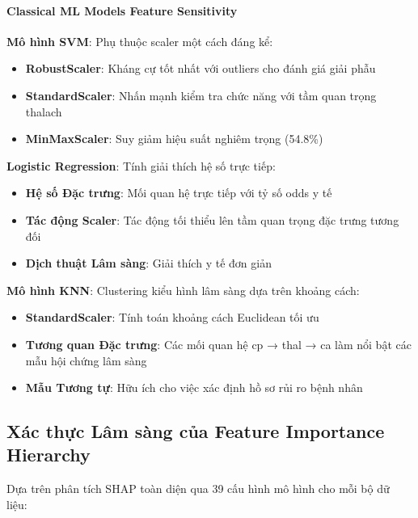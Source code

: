 \paragraph{Classical ML Models Feature Sensitivity}

\textbf{Mô hình SVM}: Phụ thuộc scaler một cách đáng kể:
\begin{itemize}
    \item \textbf{RobustScaler}: Kháng cự tốt nhất với outliers cho đánh giá giải phẫu
    \item \textbf{StandardScaler}: Nhấn mạnh kiểm tra chức năng với tầm quan trọng thalach
    \item \textbf{MinMaxScaler}: Suy giảm hiệu suất nghiêm trọng (54.8\%)
\end{itemize}

\textbf{Logistic Regression}: Tính giải thích hệ số trực tiếp:
\begin{itemize}
    \item \textbf{Hệ số Đặc trưng}: Mối quan hệ trực tiếp với tỷ số odds y tế
    \item \textbf{Tác động Scaler}: Tác động tối thiểu lên tầm quan trọng đặc trưng tương đối
    \item \textbf{Dịch thuật Lâm sàng}: Giải thích y tế đơn giản
\end{itemize}

\textbf{Mô hình KNN}: Clustering kiểu hình lâm sàng dựa trên khoảng cách:
\begin{itemize}
    \item \textbf{StandardScaler}: Tính toán khoảng cách Euclidean tối ưu
    \item \textbf{Tương quan Đặc trưng}: Các mối quan hệ cp → thal → ca làm nổi bật các mẫu hội chứng lâm sàng
    \item \textbf{Mẫu Tương tự}: Hữu ích cho việc xác định hồ sơ rủi ro bệnh nhân
\end{itemize}

\subsection{Xác thực Lâm sàng của Feature Importance Hierarchy}

Dựa trên phân tích SHAP toàn diện qua 39 cấu hình mô hình cho mỗi bộ dữ liệu:

